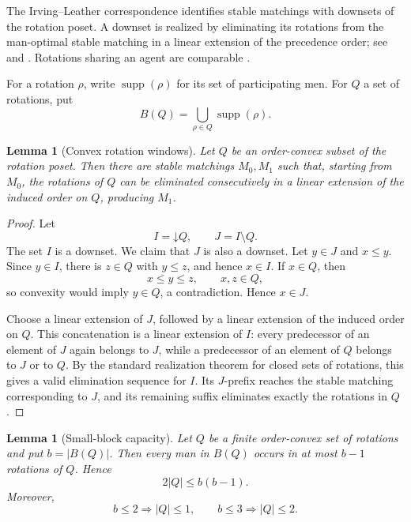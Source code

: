 \documentclass[11pt]{article}
\numberwithin{equation}{section}
\newtheorem{lemma}[theorem]{Lemma}
\theoremstyle{definition}
\theoremstyle{remark}
\newcommand{\supp}{\operatorname{supp}}
\newcommand{\down}{\mathord{\downarrow}}
\begin{document}
The Irving--Leather correspondence \cite{IrvingLeather1986} identifies
stable matchings with downsets of the rotation poset.  A downset is realized
by eliminating its rotations from the man-optimal stable matching in a
linear extension of the precedence order; see \cite{GusfieldIrving1989}
and \cite[Theorem~4.5]{KarlinOGW2018}.  Rotations sharing an agent are
comparable \cite[Claim~4.6]{KarlinOGW2018}.

For a rotation $\rho$, write $\supp(\rho)$ for its set of participating men.
For $Q$ a set of rotations, put
\[
        B(Q)=\bigcup_{\rho\in Q}\supp(\rho).
\]

\begin{lemma}[Convex rotation windows]\label{lem:convex-window}
Let $Q$ be an order-convex subset of the rotation poset.  Then there are
stable matchings $M_0,M_1$ such that, starting from $M_0$, the rotations of
$Q$ can be eliminated consecutively in a linear extension of the induced
order on $Q$, producing $M_1$.
\end{lemma}

\begin{proof}
Let
\[
        I=\down Q,\qquad J=I\setminus Q.
\]
The set $I$ is a downset.  We claim that $J$ is also a downset.  Let
$y\in J$ and $x\le y$.  Since $y\in I$, there is $z\in Q$ with $y\le z$,
and hence $x\in I$.  If $x\in Q$, then
\[
        x\le y\le z,\qquad x,z\in Q,
\]
so convexity would imply $y\in Q$, a contradiction.  Hence $x\in J$.

Choose a linear extension of $J$, followed by a linear extension of the
induced order on $Q$.  This concatenation is a linear extension of $I$:
every predecessor of an element of $J$ again belongs to $J$, while a
predecessor of an element of $Q$ belongs to $J$ or to $Q$.  By the standard
realization theorem for closed sets of rotations, this gives a valid
elimination sequence for $I$.  Its $J$-prefix reaches the stable matching
corresponding to $J$, and its remaining suffix eliminates exactly the
rotations in $Q$.
\end{proof}

\begin{lemma}[Small-block capacity]\label{lem:small-block}
Let $Q$ be a finite order-convex set of rotations and put $b=|B(Q)|$.
Then every man in $B(Q)$ occurs in at most $b-1$ rotations of $Q$.  Hence
\[
        2|Q|\le b(b-1).
\]
Moreover,
\[
        b\le2\Longrightarrow |Q|\le1,
        \qquad
        b\le3\Longrightarrow |Q|\le2.
\]
\end{lemma}
\end{document}
